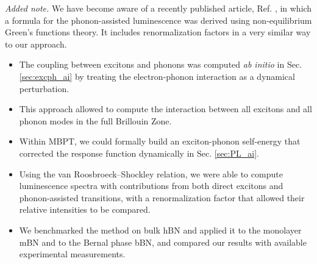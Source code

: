 \textit{Added note.} We have become aware of a recently published article, Ref. \cite{cudazzo2023dynamical}, in which a formula for the phonon-assisted luminescence was derived using non-equilibrium Green's functions theory. It includes renormalization factors in a very similar way to our approach.

\vspace{1cm}
\begin{tcolorbox}[enhanced jigsaw,breakable,pad at break*=1mm,
	colback=cyanamu!5!white,colframe=blueamu!90!white,title=Summary of Chapter {\hypersetup{linkcolor=.}\ref{chap:mBN}}.]
	\begin{itemize}
		\item The coupling between excitons and phonons was computed \textit{ab initio} in Sec. \ref{sec:excph_ai} by treating the electron-phonon interaction as a dynamical perturbation.
		\item This approach allowed to compute the interaction between all excitons and all phonon modes in the full Brillouin Zone.
		\item Within \acrshort{MBPT}, we could formally build an exciton-phonon self-energy that corrected the response function dynamically in Sec. \ref{sec:PL_ai}.
		\item Using the van Roosbroeck--Shockley relation, we were able to compute luminescence spectra with contributions from both direct excitons and phonon-assisted transitions, with a renormalization factor that allowed their relative intensities to be compared.
		\item We benchmarked the method on bulk \acrshort{hBN} and applied it to the monolayer \acrshort{mBN} and to the Bernal phase \acrshort{bBN}, and compared our results with available experimental measurements.
	\end{itemize}  
\end{tcolorbox}

\newpage